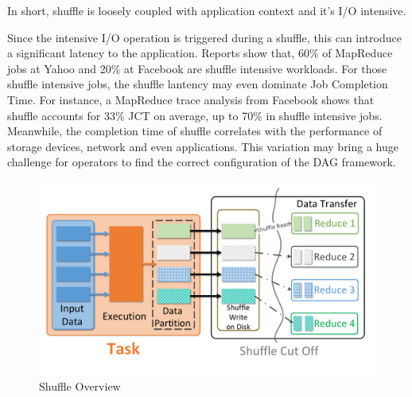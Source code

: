 In short, shuffle is loosely coupled with application context and it's I/O intensive.

Since the intensive I/O operation is triggered during a shuffle, this can introduce a significant latency to the application. Reports show that, 60\% of MapReduce jobs at Yahoo
and 20\% at Facebook are shuffle intensive workloads\cite{shufflewatcher}. For those shuffle intensive jobs, the shuffle lantency may even dominate Job Completion Time. 
For instance, a MapReduce trace analysis from Facebook shows that shuffle accounts for 33\% JCT on average, up to 70\% in shuffle intensive jobs\cite{managing}.
Meanwhile, the completion time of shuffle correlates with the performance of storage devices, network and even applications. 
This variation may bring a huge challenge for operators to find the correct configuration of the DAG framework.
\begin{figure}
	\centering
	\includegraphics[width=\linewidth]{fig/shuffle_process}
	\caption{Shuffle Overview}
	\label{fig:shuffle_process}
\end{figure}

